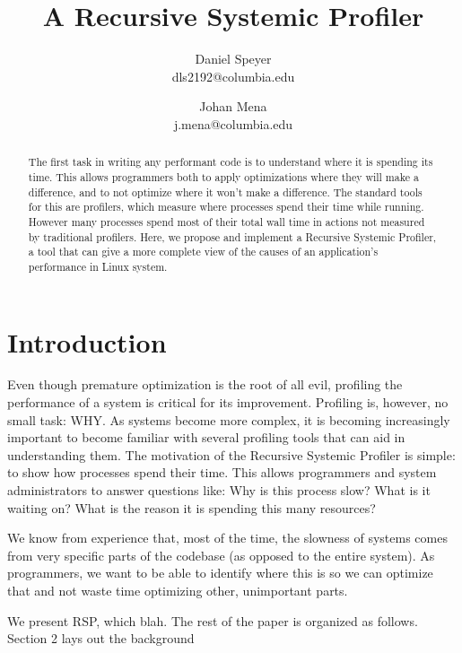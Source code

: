 \documentclass[10pt]{article}
\begin{document}
\author{Daniel Speyer\\dls2192@columbia.edu \and Johan Mena\\j.mena@columbia.edu}
\title{A Recursive Systemic Profiler}

\twocolumn[
\begin{@twocolumnfalse}
\maketitle

\end{@twocolumnfalse}
]

\begin{abstract}
The first task in writing any performant code is to understand where it is spending its time. This allows programmers both to apply optimizations where they will make a difference, and to not optimize where it won't make a difference. The standard tools for this are profilers, which measure where processes spend their time while running. However many processes spend most of their total wall time in actions not measured by traditional profilers. Here, we propose and implement a Recursive Systemic Profiler, a tool that can give a more complete view of the causes of an application’s performance in Linux system.
\end{abstract}

\section{Introduction}
Even though premature optimization is the root of all evil, profiling the performance of a system is critical for its improvement. Profiling is, however, no small task: WHY. As systems become more complex, it is becoming increasingly important to become familiar with several profiling tools that can aid in understanding them. The motivation of the Recursive Systemic Profiler is simple: to show how processes spend their time. This allows programmers and system administrators to answer questions like: Why is this process slow? What is it waiting on? What is the reason it is spending this many resources?

We know from experience that, most of the time, the slowness of systems comes from very specific parts of the codebase (as opposed to the entire system). As programmers, we want to be able to identify where this is so we can optimize that and not waste time optimizing other, unimportant parts.

We present RSP, which blah.
The rest of the paper is organized as follows. Section 2 lays out the background 
\end{document}
